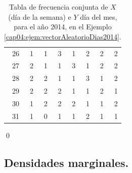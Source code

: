 \begin{ejemplo}
\begin{table}[p]
\begin{tabular}{|r|r|r|r|r|r|r|r|}
  26 &   1 &   1 &   3 &   1 &   2 &   2 &   2 \\
  27 &   2 &   1 &   1 &   3 &   1 &   2 &   2 \\
  28 &   2 &   2 &   1 &   1 &   3 &   1 &   2 \\
  29 &   2 &   2 &   2 &   1 &   1 &   2 &   1 \\
  30 &   1 &   2 &   2 &   2 &   1 &   1 &   2 \\
  31 &   1 &   0 &   1 &   1 &   2 &   1 &   1 \\
   \hline
\end{tabular}
\caption{Tabla de frecuencia conjunta de $X$ (día de la semana) e $Y$ día del mes, para el año 2014, en el Ejemplo \ref{cap04:ejem:vectorAleatorioDias2014}.}
\label{cap04:tabla:vectorAleatorioDias2014}
\end{table}
\qed
\end{ejemplo}


\subsection{Densidades marginales.}
\label{cap04:subsec:DendidadesMarginales}

